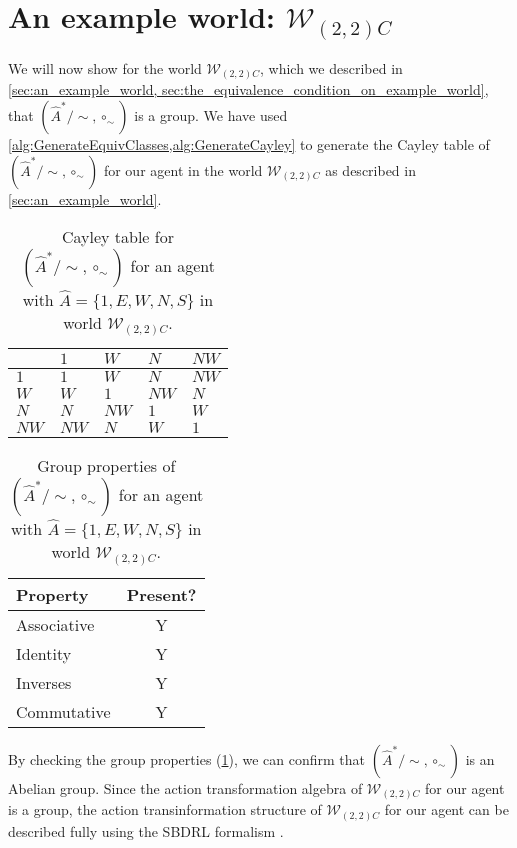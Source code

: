 \section{
An example world\texorpdfstring{: $\mathscr{W}_{(2,2)C}$}{}
}

We will now show for the world $\mathscr{W}_{(2,2)C}$, which we described in \cref{sec:an_example_world, sec:the_equivalence_condition_on_example_world}, that $(\hat{A}^{*}/\sim, \circ_{\sim})$ is a group.
We have used \cref{alg:GenerateEquivClasses,alg:GenerateCayley} to generate the Cayley table of $(\hat{A}^{*}/\sim, \circ_{\sim})$ for our agent in the world $\mathscr{W}_{(2,2)C}$ as described in \cref{sec:an_example_world}.

\begin{table}[H]
\centering
\begin{tabular}{l| llll}
     & $1$ & $W$  & $N$  & $NW$ \\
    \hline
    $1$ & $1$ & $W$  & $N$  & $NW$ \\
    $W$ & $W$ & $1$  & $NW$ & $N$  \\
    $N$ & $N$ & $NW$ & $1$  & $W$  \\
    $NW$ & $NW$ & $N$ & $W$  & $1$  \\
\end{tabular}
\caption{
Cayley table for $(\hat{A}^{*}/\sim, \circ_{\sim})$ for an agent with $\hat{A} = \{1, E, W, N, S \}$ in world $\mathscr{W}_{(2,2)C}$.
}
\end{table}

\begin{table}[H]
\centering
\begin{tabular}{l|c}
\textbf{Property} & \textbf{Present?} \\
\hline
Associative & Y \\
Identity & Y \\
Inverses & Y \\
Commutative & Y \\
\end{tabular}
\caption{
Group properties of $(\hat{A}^{*}/\sim, \circ_{\sim})$ for an agent with $\hat{A} = \{1, E, W, N, S \}$ in world $\mathscr{W}_{(2,2)C}$.
}
\label{tab:example_1_group_properties}
\end{table}

By checking the group properties (\cref{tab:example_1_group_properties}), we can confirm that $(\hat{A}^{*}/\sim, \circ_{\sim})$ is an Abelian group.
Since the action transformation algebra of $\mathscr{W}_{(2,2)C}$ for our agent is a group, the action transinformation structure of $\mathscr{W}_{(2,2)C}$ for our agent can be described fully using the SBDRL formalism .


